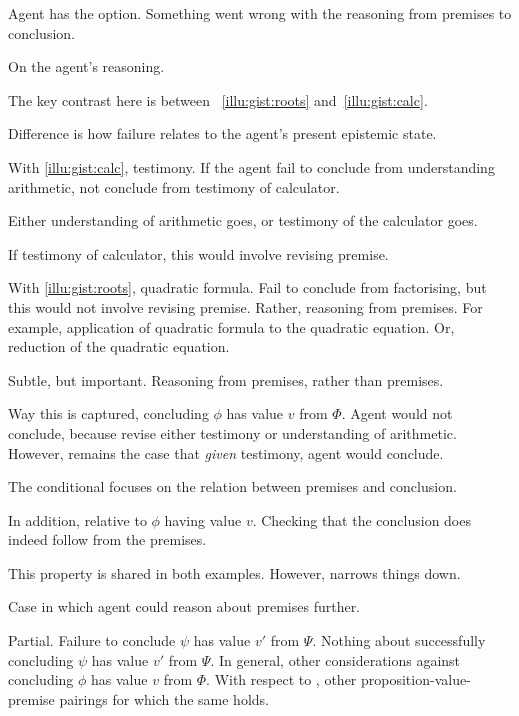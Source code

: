 \begin{note}[Check]
  Agent has the option.
  Something went wrong with the reasoning from premises to conclusion.
\end{note}

\begin{note}
  On the agent's reasoning.

  The key contrast here is between ~\ref{illu:gist:roots} and~\ref{illu:gist:calc}.

    Difference is how failure relates to the agent's present epistemic state.

  With \autoref{illu:gist:calc}, testimony.
  If the agent fail to conclude from understanding arithmetic, not conclude from testimony of calculator.

  Either understanding of arithmetic goes, or testimony of the calculator goes.

  If testimony of calculator, this would involve revising premise.

  With \autoref{illu:gist:roots}, quadratic formula.
  Fail to conclude from factorising, but this would not involve revising premise.
  Rather, reasoning from premises.
  For example, application of quadratic formula to the quadratic equation.
  Or, reduction of the quadratic equation.

  Subtle, but important.
  Reasoning from premises, rather than premises.

  Way this is captured, concluding \(\phi\) has value \(v\) from \(\Phi\).
  Agent would not conclude, because revise either testimony or understanding of arithmetic.
  However, remains the case that \emph{given} testimony, agent would conclude.

  The conditional focuses on the relation between premises and conclusion.
\end{note}

\begin{note}
  In addition, relative to \(\phi\) having value \(v\).
  Checking that the conclusion does indeed follow from the premises.

  This property is shared in both examples.
  However, narrows things down.

  Case in which agent could reason about premises further.
\end{note}

\begin{note}
  Partial.
  Failure to conclude \(\psi\) has value \(v'\) from \(\Psi\).
  Nothing about successfully concluding \(\psi\) has value \(v'\) from \(\Psi\).
  In general, other considerations against concluding \(\phi\) has value \(v\) from \(\Phi\).
  With respect to , other proposition-value-premise pairings for which the same holds.
\end{note}





